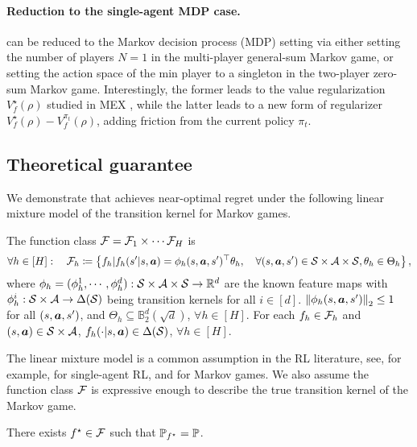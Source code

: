 \paragraph{Reduction to the single-agent MDP case.} \name can be reduced to the Markov decision process (MDP) setting via either setting the number of players $N=1$  in the multi-player general-sum Markov game, or setting the action space of the min player  to a singleton in the two-player zero-sum Markov game. Interestingly, the former leads to the value regularization $V_{f}^{\star}(\rho)$ studied in MEX \citep{liu2024maximize}, while the latter leads to a new form of regularizer $V_{f}^{\star}(\rho)-V_{f}^{\pi_t}(\rho)$, adding friction from the current policy $\pi_t$. 

 
 

\subsection{Theoretical guarantee}\label{sec:markov_analysis}

We demonstrate that \name achieves near-optimal regret under the following linear mixture model of the transition kernel for Markov games.


\begin{asmp}\label{asmp:function_class}
    The function class ${\mathcal{F}}={\mathcal{F}}_1\times\cdots{\mathcal{F}}_H$ is
    $$\forall h\in[H]:\quad{\mathcal{F}}_h\coloneqq\left\{f_h|f_h(s'|s,{\bm{a}})=\phi_h(s,{\bm{a}},s')^\top{\theta_h},\quad \forall (s,{\bm{a}},s')\in{\mathcal{S}}\times{\mathcal{A}}\times{\mathcal{S}},\theta_h\in\Theta_h\right\},$$
    where $\phi_h=(\phi_h^1,\cdots,\phi_h^d):{\mathcal{S}}\times{\mathcal{A}}\times{\mathcal{S}}\rightarrow\mathbb{R}^d$ are the known feature maps with $\phi_h^i:{\mathcal{S}}\times{\mathcal{A}}\rightarrow\Delta({\mathcal{S}})$ being transition kernels for all $i\in[d]$. $\left\| \phi_h(s,{\bm{a}},s') \right\|_2\leq 1$ for all $(s,{\bm{a}},s')$, and $\Theta_h\subseteq\mathbb{B}^d_2(\sqrt{d})$, $\forall h\in[H]$. For each $f_h\in{\mathcal{F}}_h$ and $(s,{\bm{a}})\in{\mathcal{S}}\times{\mathcal{A}}$, $f_h(\cdot|s,{\bm{a}})\in\Delta({\mathcal{S}})$, $\forall h\in[H]$.
\end{asmp}
The linear mixture model is a common assumption in the RL literature, see, for example, \citet{ayoub2020model,modi2020sample,cai2020provably} for  single-agent RL, and \citet{chen2022almost,liu2024maximize} for Markov games.
We also assume the function class ${\mathcal{F}}$ is expressive enough to describe the true transition kernel of the Markov game.
\begin{asmp}[realizability]\label{asmp:realizable}
    There exists $f^\star\in{\mathcal{F}}$ such that ${\mathbb P}_{f^\star}={\mathbb P}$.
\end{asmp}

